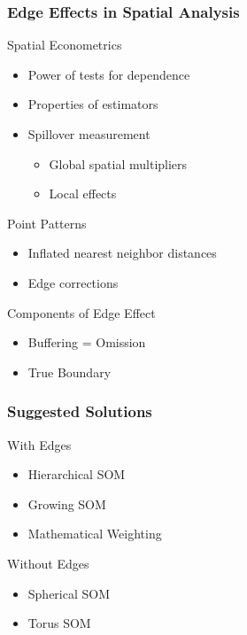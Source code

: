 \documentclass[nototal,handout]{beamer}
\begin{document}
\begin{frame}
	\frametitle{Edge Effects in Spatial Analysis}
 
\begin{block}{Spatial Econometrics}
 \begin{itemize}
 \item  Power of tests for dependence
 \item  Properties of estimators
 \item  Spillover measurement
 \begin{itemize}
 \item  Global spatial multipliers
 \item  Local effects
 \end{itemize}
 \end{itemize}
 \end{block} 
\begin{block}{Point Patterns}
 \begin{itemize}
 \item  Inflated nearest neighbor distances
 \item  Edge corrections
 \end{itemize}
 \end{block} 
\begin{block}{Components of Edge Effect}
 \begin{itemize}
 \item  Buffering = Omission
 \item  True Boundary
 \end{itemize}
 \end{block} \end{frame} 

\begin{frame}
	\frametitle{Suggested Solutions}
 
\begin{block}{With Edges}
 \begin{itemize}
 \item  Hierarchical SOM
 \item  Growing SOM
 \item  Mathematical Weighting
 \end{itemize}
 \end{block} 
\begin{block}{Without Edges}
 \begin{itemize}
 \item  Spherical SOM
 \item  Torus SOM
 \end{itemize}
 \end{block} \end{frame} 
\end{document}

